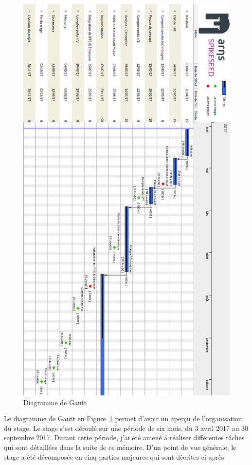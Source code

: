 \documentclass{tnreport}
\begin{document}
\begin{figure}[h]
	\centering
	\includegraphics[scale=0.67]{figures/gantt-stage-vertical}
	\caption{Diagramme de Gantt}
	\label{fig:gantt}
\end{figure}

\clearpage

Le diagramme de Gantt en Figure~\ref{fig:gantt} permet d'avoir un aperçu de l'organisation du stage. Le stage s'est déroulé sur une période de six mois, du 3 avril 2017 au 30 septembre 2017. Durant cette période, j'ai été amené à réaliser différentes tâches qui sont détaillées dans la suite de ce mémoire. D'un point de vue générale, le stage a été décomposée en cinq parties majeures qui sont décrites ci-après.
\end{document}
